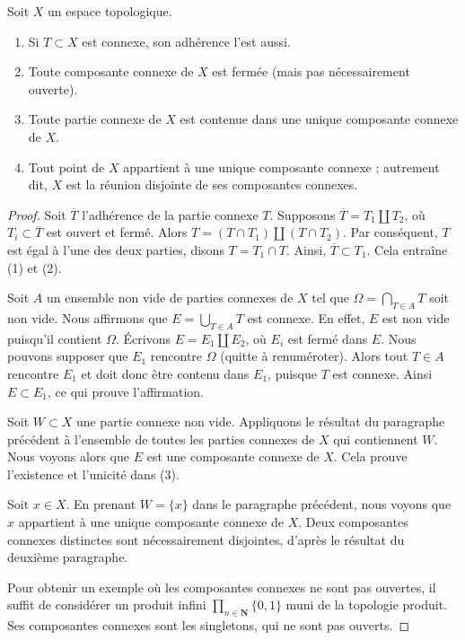 \begin{lemma}
\label{lemma-connected-components}
Soit $X$ un espace topologique.
\begin{enumerate}
\item Si $T \subset X$ est connexe, son adhérence l'est aussi.
\item Toute composante connexe de $X$ est fermée (mais pas nécessairement
ouverte).
\item Toute partie connexe de $X$ est contenue dans une unique composante
connexe de $X$.
\item Tout point de $X$ appartient à une unique composante connexe ; autrement
dit, $X$ est la réunion disjointe de ses composantes connexes.
\end{enumerate}
\end{lemma}

\begin{proof}
Soit $\overline{T}$ l'adhérence de la partie connexe $T$.
Supposons $\overline{T} = T_1 \amalg T_2$, où
$T_i \subset \overline{T}$ est ouvert et fermé. Alors
$T = (T\cap T_1) \amalg (T \cap T_2)$. Par conséquent, $T$ est égal à l'une
des deux parties, disons $T = T_1 \cap T$. Ainsi,
$\overline{T} \subset T_1$. Cela entraîne (1) et (2).

\medskip\noindent
Soit $A$ un ensemble non vide de parties connexes de $X$ tel que
$\Omega = \bigcap_{T \in A} T$ soit non vide. Nous affirmons que
$E = \bigcup_{T \in A} T$ est connexe. En effet, $E$ est non vide puisqu'il
contient $\Omega$. Écrivons $E = E_1 \amalg E_2$, où $E_i$ est fermé dans
$E$. Nous pouvons supposer que $E_1$ rencontre $\Omega$ (quitte à renuméroter).
Alors tout $T \in A$ rencontre $E_1$ et doit donc être contenu dans $E_1$,
puisque $T$ est connexe. Ainsi $E \subset E_1$, ce qui prouve l'affirmation.

\medskip\noindent
Soit $W \subset X$ une partie connexe non vide. Appliquons le résultat du
paragraphe précédent à l'ensemble de toutes les parties connexes de $X$ qui
contiennent $W$. Nous voyons alors que $E$ est une composante connexe de $X$.
Cela prouve l'existence et l'unicité dans (3).

\medskip\noindent
Soit $x \in X$. En prenant $W = \{x\}$ dans le paragraphe précédent, nous
voyons que $x$ appartient à une unique composante connexe de $X$.
Deux composantes connexes distinctes sont nécessairement disjointes, d'après
le résultat du deuxième paragraphe.

\medskip\noindent
Pour obtenir un exemple où les composantes connexes ne sont pas ouvertes, il
suffit de considérer un produit infini
$\prod_{n \in \mathbf{N}} \{0, 1\}$ muni de la topologie produit. Ses
composantes connexes sont les singletons, qui ne sont pas ouverts.
\end{proof}

